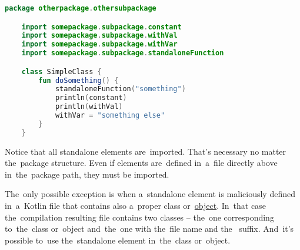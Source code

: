 \begin{lstlisting}[language=Kotlin, title={Usage}]
    package otherpackage.othersubpackage

    import somepackage.subpackage.constant
    import somepackage.subpackage.withVal
    import somepackage.subpackage.withVar
    import somepackage.subpackage.standaloneFunction

    class SimpleClass {
        fun doSomething() {
            standaloneFunction("something")
            println(constant)
            println(withVal)
            withVar = "something else"
        }
    }
\end{lstlisting}
\noindent Notice that all standalone elements are~imported.
That's necessary no matter the~package structure.
Even if elements are~defined in~a~file directly above in~the~package path, they must be imported.

The~only possible exception is when a~standalone element is maliciously defined in~a~Kotlin file that contains also a~proper class or~\hyperref[kotlinobject]{object}.
In~that case the~compilation resulting  file contains two classes -- the~one corresponding to~the~class or~object and~the~one with the~file name and the~ suffix.
And~it's possible to~use the~standalone element in~the~class or~object.
